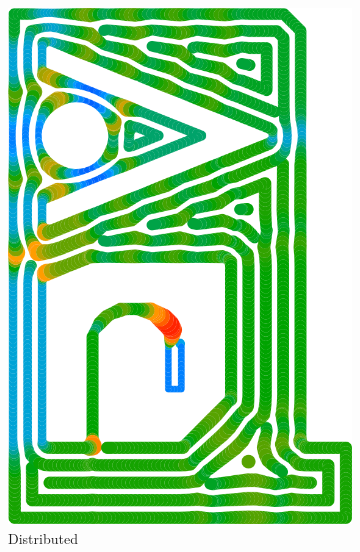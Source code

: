 \begin{figure}
\begin{subfigure}{\figwidth}
\includegraphics[height=\figheight]{sources/validation/gMAT_example/TEST_Distributed_widths.png}
\caption{Distributed}\label{TEST_Distributed_accuracy}
\end{subfigure}
\begin{subfigure}{\figwidth}\centering

\end{subfigure}
\end{figure}
